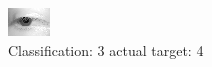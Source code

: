 \begin{figure}[h!]
\begin{center}
\includegraphics[width=0.60\columnwidth]{figures/ID2671_class_3_target_4.png}
\end{center}
\caption{ Classification: 3 actual target: 4}
\label{fig:ID2671_class_3_target_4}
\end{figure}
